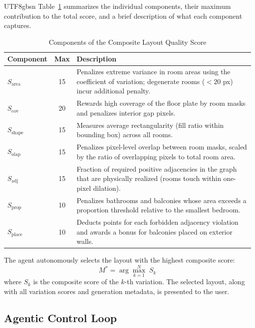 \documentclass[11pt]{article}
\begin{document}
\begin{CJK}{UTF8}{gbsn}
\noindent Table~\ref{tab:scoring_components} summarizes the individual components, their maximum contribution to the total score, and a brief description of what each component captures.

\begin{table}[H]
\caption{Components of the Composite Layout Quality Score}
\centering
\begin{tabular}{|l|c|p{9cm}|}
\hline
\textbf{Component} & \textbf{Max} & \textbf{Description} \\
\hline
$S_{\mathrm{area}}$ & 15 & Penalizes extreme variance in room areas using the coefficient of variation; degenerate rooms ($< 20$ px) incur additional penalty. \\
\hline
$S_{\mathrm{cov}}$ & 20 & Rewards high coverage of the floor plate by room masks and penalizes interior gap pixels. \\
\hline
$S_{\mathrm{shape}}$ & 15 & Measures average rectangularity (fill ratio within bounding box) across all rooms. \\
\hline
$S_{\mathrm{olap}}$ & 15 & Penalizes pixel-level overlap between room masks, scaled by the ratio of overlapping pixels to total room area. \\
\hline
$S_{\mathrm{adj}}$ & 15 & Fraction of required positive adjacencies in the graph that are physically realized (rooms touch within one-pixel dilation). \\
\hline
$S_{\mathrm{prop}}$ & 10 & Penalizes bathrooms and balconies whose area exceeds a proportion threshold relative to the smallest bedroom. \\
\hline
$S_{\mathrm{place}}$ & 10 & Deducts points for each forbidden adjacency violation and awards a bonus for balconies placed on exterior walls. \\
\hline
\end{tabular}
\label{tab:scoring_components}
\end{table}

The agent autonomously selects the layout with the highest composite score:
\begin{equation}
M^{*} = \arg\max_{k=1}^{N}\; S_k
\end{equation}
where $S_k$ is the composite score of the $k$-th variation. The selected layout, along with all variation scores and generation metadata, is presented to the user.

\subsection*{Agentic Control Loop}


\end{CJK}
\end{document}
